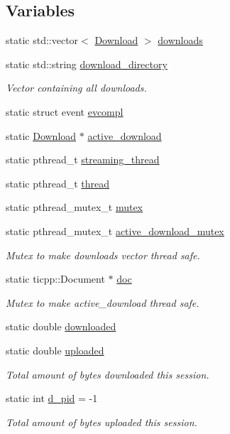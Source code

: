 \subsection*{Variables}
\begin{DoxyCompactItemize}
\item 
static std::vector$<$ \hyperlink{classDownload}{Download} $>$ \hyperlink{namespaceDownloadManager_acc325ba65ac10c7502cfda3c9e94b8c6}{downloads}
\item 
static std::string \hyperlink{namespaceDownloadManager_ade2c3e233a47be865abbe4a056de7f51}{download\_\-directory}
\begin{DoxyCompactList}\small\item\em Vector containing all downloads. \end{DoxyCompactList}\item 
static struct event \hyperlink{namespaceDownloadManager_a5c32639a9556b458f202030cf1618124}{evcompl}
\item 
static \hyperlink{classDownload}{Download} $\ast$ \hyperlink{namespaceDownloadManager_a494f4d96351586b19499df59dda4e304}{active\_\-download}
\item 
static pthread\_\-t \hyperlink{namespaceDownloadManager_ab3d18bc6835ffd77ae46b30bfd84dcce}{streaming\_\-thread}
\item 
static pthread\_\-t \hyperlink{namespaceDownloadManager_a438b620345d580423549ba5e353643c9}{thread}
\item 
static pthread\_\-mutex\_\-t \hyperlink{namespaceDownloadManager_ab2c641361cf79e8ab59d345508a48440}{mutex}
\item 
static pthread\_\-mutex\_\-t \hyperlink{namespaceDownloadManager_a515aa52eb5e3ee12d7db95cb84a3f8ce}{active\_\-download\_\-mutex}
\begin{DoxyCompactList}\small\item\em Mutex to make downloads vector thread safe. \end{DoxyCompactList}\item 
static ticpp::Document $\ast$ \hyperlink{namespaceDownloadManager_afda6cacf879053184329453681a7e4d1}{doc}
\begin{DoxyCompactList}\small\item\em Mutex to make active\_\-download thread safe. \end{DoxyCompactList}\item 
static double \hyperlink{namespaceDownloadManager_aebcd419189cce8e57f71d642b6b0538a}{downloaded}
\item 
static double \hyperlink{namespaceDownloadManager_ac4190db8c08d26906ed2ea2d4e115794}{uploaded}
\begin{DoxyCompactList}\small\item\em Total amount of bytes downloaded this session. \end{DoxyCompactList}\item 
static int \hyperlink{namespaceDownloadManager_a6aaa0efb9476dcf004cbb6192f8236a1}{d\_\-pid} = -\/1
\begin{DoxyCompactList}\small\item\em Total amount of bytes uploaded this session. \end{DoxyCompactList}\end{DoxyCompactItemize}


